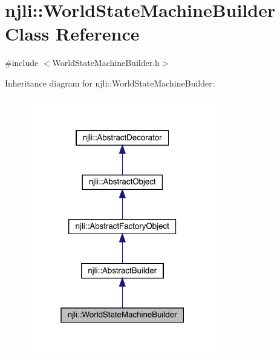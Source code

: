\hypertarget{classnjli_1_1_world_state_machine_builder}{}\section{njli\+:\+:World\+State\+Machine\+Builder Class Reference}
\label{classnjli_1_1_world_state_machine_builder}


{\ttfamily \#include $<$World\+State\+Machine\+Builder.\+h$>$}



Inheritance diagram for njli\+:\+:World\+State\+Machine\+Builder\+:\nopagebreak
\begin{figure}[H]
\begin{center}
\leavevmode
\includegraphics[width=232pt]{classnjli_1_1_world_state_machine_builder__inherit__graph}
\end{center}
\end{figure}


